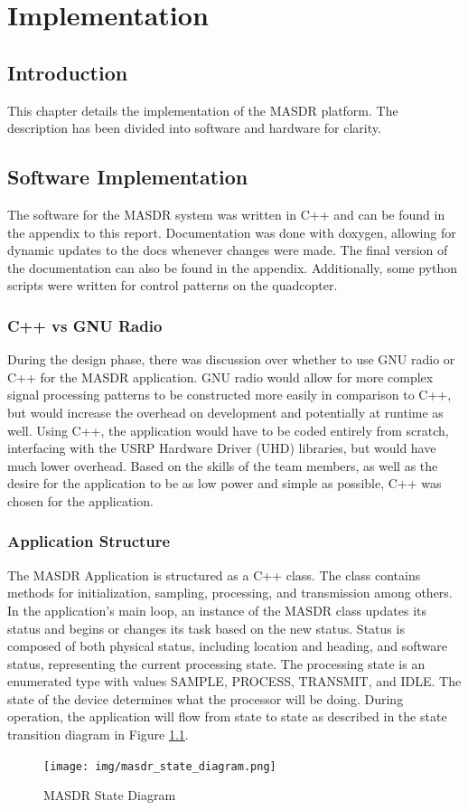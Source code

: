 \chapter{Implementation}

\section{Introduction}
This chapter details the implementation of the MASDR platform. The description has been divided into software and hardware for clarity.

\section{Software Implementation}
The software for the MASDR system was written in C++ and can be found in the appendix to this report. Documentation was done with doxygen, allowing for dynamic updates to the docs whenever changes were made. The final version of the documentation can also be found in the appendix. Additionally, some python scripts were written for control patterns on the quadcopter.
\subsection{C++ vs GNU Radio}
During the design phase, there was discussion over whether to use GNU radio or C++ for the MASDR application. GNU radio would allow for more complex signal processing patterns to be constructed more easily in comparison to C++, but would increase the overhead on development and potentially at runtime as well. Using C++, the application would have to be coded entirely from scratch, interfacing with the USRP Hardware Driver (UHD) libraries, but would have much lower overhead. Based on the skills of the team members, as well as the desire for the application to be as low power and simple as possible, C++ was chosen for the application.
\subsection{Application Structure}
The MASDR Application is structured as a C++ class. The class contains methods for initialization, sampling, processing, and transmission among others. In the application’s main loop, an instance of the MASDR class updates its status and begins or changes its task based on the new status. Status is composed of both physical status, including location and heading, and software status, representing the current processing state. The processing state is an enumerated type with values SAMPLE, PROCESS, TRANSMIT, and IDLE. The state of the device determines what the processor will be doing. During operation, the application will flow from state to state as described in the state transition diagram in Figure \ref{fig:state_diagram}.
\begin{figure}[ht]
\centering
\texttt{[image: img/masdr\_state\_diagram.png]}
\caption{MASDR State Diagram}
\label{fig:state_diagram}
\end{figure}
